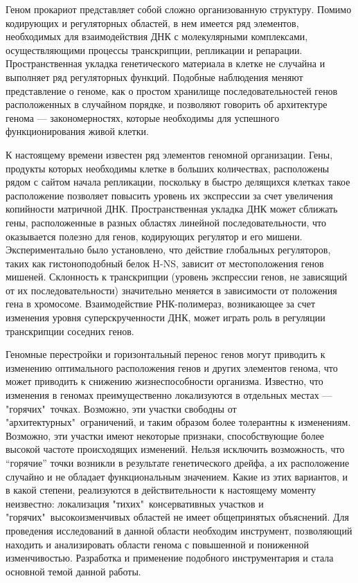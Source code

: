 
{\actuality} Геном прокариот представляет собой сложно организованную структуру. Помимо кодирующих и регуляторных областей, в нем имеется ряд элементов, необходимых для взаимодействия ДНК с молекулярными комплексами, осуществляющими процессы транскрипции, репликации и репарации. Пространственная укладка генетического материала в клетке не случайна и выполняет ряд регуляторных функций. Подобные наблюдения меняют представление о геноме, как о простом хранилище последовательностей генов расположенных в случайном порядке, и позволяют говорить об архитектуре генома --- закономерностях, которые необходимы для успешного функционирования живой клетки.

К настоящему времени известен ряд элементов геномной организации. Гены, продукты которых необходимы клетке в больших количествах, расположены рядом с сайтом начала репликации, поскольку в быстро делящихся клетках такое расположение позволяет повысить уровень их экспрессии за счет увеличения копийности матричной ДНК. Пространственная укладка ДНК может сближать гены, расположенные в разных областях линейной последовательности, что оказывается полезно для генов, кодирующих регулятор и его мишени. Экспериментально было установлено, что действие глобальных регуляторов, таких как гистоноподобный белок H-NS, зависит от местоположения генов мишеней. Склонность к транскрипции (уровень экспрессии генов, не зависящий от их последовательности) значительно меняется в зависимости от положения гена в хромосоме. Взаимодействие РНК-полимераз, возникающее за счет изменения уровня суперскрученности ДНК, может играть роль в регуляции транскрипции соседних генов.

Геномные перестройки и горизонтальный перенос генов могут приводить к изменению оптимального расположения генов и других элементов генома, что может приводить к снижению жизнеспособности организма. Известно, что изменения в геномах преимущественно локализуются в отдельных местах --- "горячих"\ точках. Возможно, эти участки свободны от "архитектурных"\ ограничений, и таким образом более толерантны к изменениям. Возможно, эти участки имеют некоторые признаки, способствующие более высокой частоте происходящих изменений. Нельзя исключить возможность, что ``горячие'' точки возникли в результате генетического дрейфа, а их расположение случайно и не обладает функциональным значением. Какие из этих вариантов, и в какой степени, реализуются в действительности к настоящему моменту неизвестно: локализация "тихих"\ консервативных участков и "горячих"\ высокоизменчивых областей не имеет общепринятых объяснений. Для проведения исследований в данной области необходим инструмент, позволяющий находить и анализировать области генома с повышенной и пониженной изменчивостью. Разработка и применение подобного инструментария и стала основной темой данной работы. 

